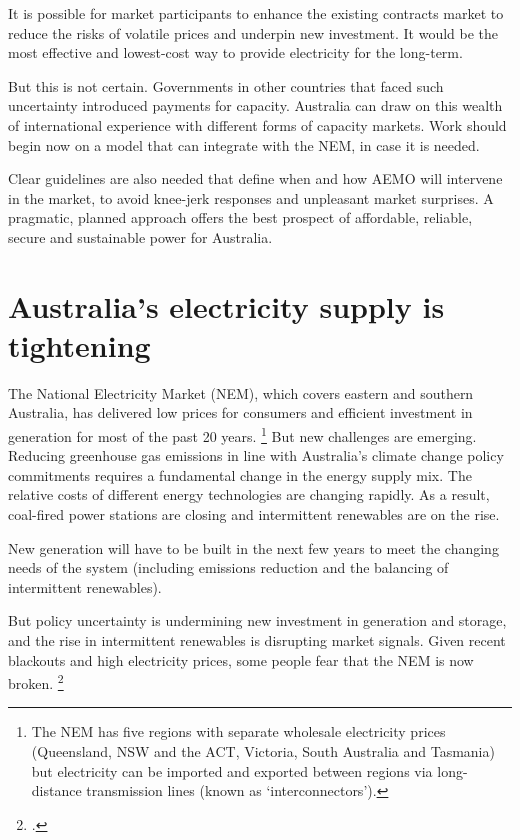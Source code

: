 \documentclass[FrontPage]{grattan}
\begin{document}
\begin{overview}
It is possible for market participants to enhance the existing contracts market to reduce the risks of volatile prices and underpin new investment. It would be the most effective and lowest-cost way to provide electricity for the long-term. 
 
But this is not certain. Governments in other countries that faced such uncertainty introduced payments for capacity. Australia can draw on this wealth of international experience with different forms of capacity markets. Work should begin now on a model that can integrate with the NEM, in case it is needed.

Clear guidelines are also needed that define when and how AEMO will intervene in the market, to avoid knee-jerk responses and unpleasant market surprises. A pragmatic, planned approach offers the best prospect of affordable, reliable, secure and sustainable power for Australia. 
\end{overview}


\contentspage

\chapter{Australia's electricity supply is tightening}\label{chap:australias-electricity-supply-is-tightening}

The National Electricity Market (NEM), which covers eastern and southern Australia, has delivered low prices for consumers and efficient investment in generation for most of the past 20 years.%
\footnote{The NEM has five regions with separate wholesale electricity prices (Queensland, NSW and the ACT, Victoria, South Australia and Tasmania) but electricity can be imported and exported between regions via long-distance transmission lines (known as `interconnectors').}
But new challenges are emerging. Reducing greenhouse gas emissions in line with Australia's climate change policy commitments requires a fundamental change in the energy supply mix. The relative costs of different energy technologies are changing rapidly. As a result, coal-fired power stations are closing and intermittent renewables are on the rise.

New generation will have to be built in the next few years to meet the changing needs of the system (including emissions reduction and the balancing of intermittent renewables).

But policy uncertainty is undermining new investment in generation and storage, and the rise in intermittent renewables is disrupting market signals. Given recent blackouts and high electricity prices, some people fear that the NEM is now broken.%
\footcites{Bailey2017NEMbroken}{ABC2017WeatherillNEMbroken}{AFR2017BHPNEMbroken}{AFR2017TingleNEMbroken}{Nelson2016NewNEM}
\end{document}
